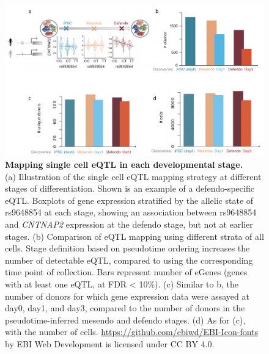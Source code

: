 \begin{figure}[h]
\centering
\includegraphics[width=14cm]{Chapter4/Fig/endodiff_eqtl.png}
\caption[eQTL maps of iPSC, mesendo, defendo]{\textbf{Mapping single cell eQTL in each developmental stage.}\\
(a) Illustration of the single cell eQTL mapping strategy at different stages of differentiation.
Shown is an example of a defendo-specific eQTL. 
Boxplots of gene expression stratified by the allelic state of
rs9648854 at each stage, showing an association between rs9648854 and \textit{CNTNAP2} expression at the defendo stage, but not at earlier stages. 
(b) Comparison of eQTL mapping using different strata of all cells.
Stage definition based on pseudotime ordering increases the number of detectable eQTL, compared to using the corresponding time point of collection.
Bars represent number of eGenes (genes with at least one eQTL, at FDR < 10\%).
(c) Similar to b, the number of donors for which gene expression data were assayed at day0, day1, and day3, compared to the number of donors in the pseudotime-inferred mesendo and defendo stages.
(d) As for (c), with the number of cells.
\url{https://github.com/ebiwd/EBI-Icon-fonts} by EBI Web Development is licensed under CC BY 4.0. }
\label{fig:endodiff_stage_eqtl}
\end{figure}

